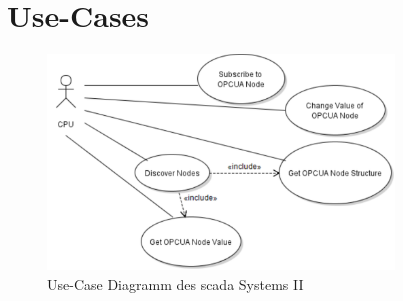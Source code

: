 \section{Use-Cases}
\begin{figure}[b]
  \centering
  \includegraphics[width=0.82\textwidth]{content/hauptteil/systemEntwurf/res/useCase/II.pdf}
  \caption[Use-Case Diagramm des \acs{scada} Systems II]{Use-Case Diagramm des \acs{scada} Systems II}
  \label{fig:UCII}
\end{figure}

